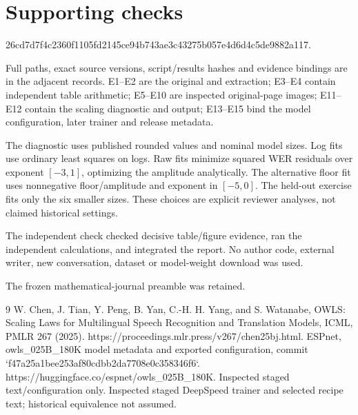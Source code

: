 \documentclass[10pt]{article}
\begin{document}
\section*{Supporting checks}
26cd7d7f4c2360f1105fd2145ce94b743ae3c43275b057e4d6d4c5de9882a117.\par
Full paths, exact source versions, script/results hashes and evidence bindings are in the adjacent records. E1–E2 are the original and extraction; E3–E4 contain independent table arithmetic; E5–E10 are inspected original-page images; E11–E12 contain the scaling diagnostic and output; E13–E15 bind the model configuration, later trainer and release metadata.\par
The diagnostic uses published rounded values and nominal model sizes. Log fits use ordinary least squares on logs. Raw fits minimize squared WER residuals over exponent \([-3,1]\), optimizing the amplitude analytically. The alternative floor fit uses nonnegative floor/amplitude and exponent in \([-5,0]\). The held-out exercise fits only the six smaller sizes. These choices are explicit reviewer analyses, not claimed historical settings.\par
The independent check checked decisive table/figure evidence, ran the independent calculations, and integrated the report. No author code, external writer, new conversation, dataset or model-weight download was used.\par
The frozen mathematical-journal preamble was retained.\par
9 W. Chen, J. Tian, Y. Peng, B. Yan, C.-H. H. Yang, and S. Watanabe, OWLS: Scaling Laws for Multilingual Speech Recognition and Translation Models, ICML, PMLR 267 (2025). https://proceedings.mlr.press/v267/chen25bj.html. ESPnet, owls\_025B\_180K model metadata and exported configuration, commit `f47a25a1bee253af80cdbb2da7708e0c358346f6`. https://huggingface.co/espnet/owls\_025B\_180K. Inspected staged text/configuration only. Inspected staged DeepSpeed trainer and selected recipe text; historical equivalence not assumed.\par
\end{document}

